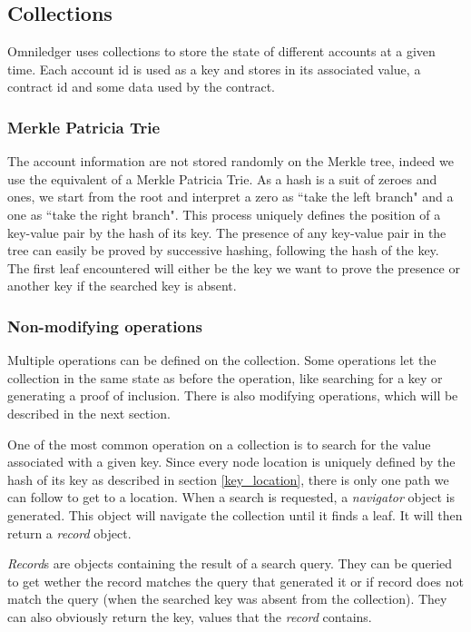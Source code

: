 \documentclass[11pt, a4paper, twoside, openright]{article}
\begin{document}
\subsection{Collections}
Omniledger uses collections to store the state of different accounts at a given time. Each account id is used as a key and stores in its associated value, a contract id and some data used by the contract.

\subsubsection{Merkle Patricia Trie}

The account information are not stored randomly on the Merkle tree, indeed we use the equivalent of a Merkle Patricia Trie\cite{trie}. As a hash is a suit of zeroes and ones, we start from the root and interpret a zero as ``take the left branch" and a one as ``take the right branch". This process uniquely defines the position of a key-value pair by the hash of its key. \label{key_location} The presence of any key-value pair in the tree can easily be proved by successive hashing, following the hash of the key. The first leaf encountered will either be the key we want to prove the presence or another key if the searched key is absent.

\subsubsection{Non-modifying operations}
Multiple operations can be defined on the collection. Some operations let the collection in the same state as before the operation, like searching for a key or generating a proof of inclusion. There is also modifying operations, which will be described in the next section.

One of the most common operation on a collection is to search for the value associated with a given key. Since every node location is uniquely defined by the hash of its key as described in section \ref{key_location}, there is only one path we can follow to get to a location. When a search is requested, a \textit{navigator} object is generated. This object will navigate the collection until it finds a leaf. It will then return a \textit{record} object.

\textit{Record}s are objects containing the result of a search query. They can be queried to get wether the record matches the query that generated it or if record does not match the query (when the searched key was absent from the collection). They can also obviously return the key, values that the \textit{record} contains.
\end{document}
